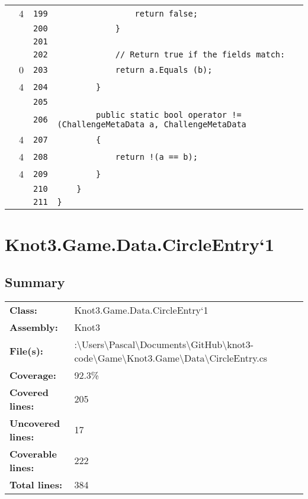 \documentclass[a4paper,10pt]{article}
\begin{document}
\begin{longtable}[l]{lrrl}
\cellcolor{green} & 4 & \verb~199~ & \verb~                return false;~\\
\cellcolor{gray} &  & \verb~200~ & \verb~            }~\\
\cellcolor{gray} &  & \verb~201~ & \verb~~\\
\cellcolor{gray} &  & \verb~202~ & \verb~            // Return true if the fields match:~\\
\cellcolor{red} & 0 & \verb~203~ & \verb~            return a.Equals (b);~\\
\cellcolor{green} & 4 & \verb~204~ & \verb~        }~\\
\cellcolor{gray} &  & \verb~205~ & \verb~~\\
\cellcolor{gray} &  & \verb~206~ & \verb~        public static bool operator != (ChallengeMetaData a, ChallengeMetaData~\\
\cellcolor{green} & 4 & \verb~207~ & \verb~        {~\\
\cellcolor{green} & 4 & \verb~208~ & \verb~            return !(a == b);~\\
\cellcolor{green} & 4 & \verb~209~ & \verb~        }~\\
\cellcolor{gray} &  & \verb~210~ & \verb~    }~\\
\cellcolor{gray} &  & \verb~211~ & \verb~}~\\
\end{longtable}
\newpage
\section{Knot3.Game.Data.CircleEntry`1}
\subsection{Summary}
\begin{longtable}[l]{ll}
\textbf{Class:} & Knot3.Game.Data.CircleEntry`1\\
\textbf{Assembly:} & Knot3\\
\textbf{File(s):} & \begin{minipage}[t]{12cm}{:\textbackslash Users\textbackslash Pascal\textbackslash Documents\textbackslash GitHub\textbackslash knot3-code\textbackslash Game\textbackslash Knot3.Game\textbackslash Data\textbackslash CircleEntry.cs}\end{minipage} \\
\textbf{Coverage:} & 92.3\%\\
\textbf{Covered lines:} & 205\\
\textbf{Uncovered lines:} & 17\\
\textbf{Coverable lines:} & 222\\
\textbf{Total lines:} & 384\\
\end{longtable}
\end{document}

